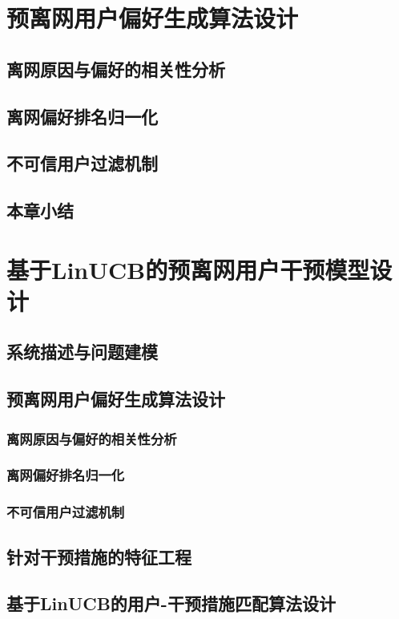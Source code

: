 \section{预离网用户偏好生成算法设计}
\subsection{离网原因与偏好的相关性分析}
\subsection{离网偏好排名归一化}
\subsection{不可信用户过滤机制}
\subsection{本章小结}

\section{基于LinUCB的预离网用户干预模型设计}
\subsection{系统描述与问题建模}

\subsection{预离网用户偏好生成算法设计}
\subsubsection{离网原因与偏好的相关性分析}
\subsubsection{离网偏好排名归一化}
\subsubsection{不可信用户过滤机制}

\subsection{针对干预措施的特征工程}
\subsection{基于LinUCB的用户-干预措施匹配算法设计}
